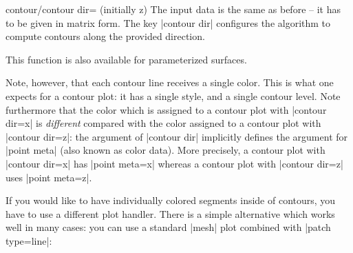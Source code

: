 {{\begin{pgfplotskey}{contour/contour dir= (initially z)}
    The input data is the same as before -- it has to be given in matrix form.
    The key |contour dir| configures the algorithm to compute contours along
    the provided direction.

\pgfplotsexpensiveexample
\begin{codeexample}[]
\end{codeexample}

    This function is also available for parameterized surfaces.

\pgfplotsexpensiveexample
\begin{codeexample}[]
\end{codeexample}

    Note, however, that each contour line receives a single color. This is what
    one expects for a contour plot: it has a single style, and a single contour
    level. Note furthermore that the color which is assigned to a contour plot
    with |contour dir=x| is \emph{different} compared with the color assigned
    to a contour plot with |contour dir=z|: the argument of |contour dir|
    implicitly defines the argument for |point meta| (also known as color
    data). More precisely, a contour plot with |contour dir=x| has
    |point meta=x| whereas a contour plot with |contour dir=z| uses
    |point meta=z|.

    If you would like to have individually colored segments inside of contours,
    you have to use a different plot handler. There is a simple alternative
    which works well in many cases: you can use a standard |mesh| plot combined
    with |patch type=line|:


\end{pgfplotskey}}}
